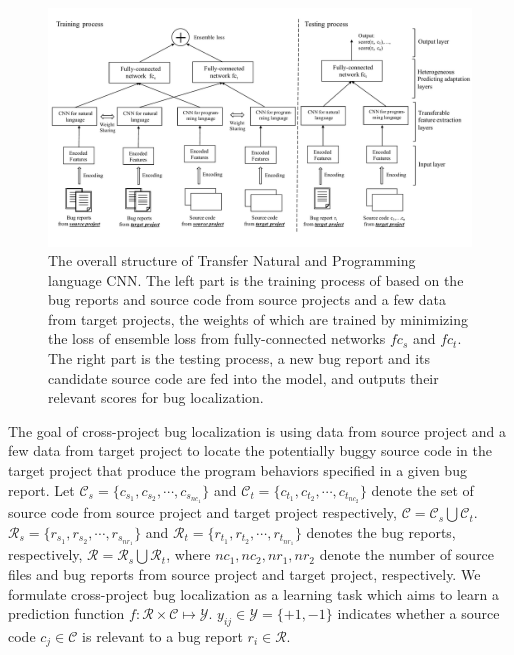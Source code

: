 \begin{figure}[hbt]
\centering
\includegraphics[width = 2\columnwidth]{pic/structure.pdf}
\caption{The overall structure of Transfer Natural and Programming language CNN.  The left part is the training process of \TRANPCNN based on the bug reports and source code from source projects and a few data from target projects, the weights of which are trained by minimizing the loss of ensemble loss from fully-connected networks $fc_s$ and $fc_t$. The right part is the testing process, a new bug report and its candidate source code are fed into the model, and \TRANPCNN outputs their relevant scores for bug localization.}
\label{fig:structure}
\end{figure}

The goal of cross-project bug localization is using data from source project and a few data from target project to locate the potentially buggy source code in the target project that produce the program behaviors specified in a
given bug report. Let $\mathcal{C}_s =\{ c_{s_1}, c_{s_2}, \cdots, c_{s_{nc_1}}\}$ and $\mathcal{C}_t =\{ c_{t_1}, c_{t_2}, \cdots, c_{t_{nc_2}}\}$ denote the set of source code from source project and target project respectively, $\mathcal{C}=\mathcal{C}_s \bigcup \mathcal{C}_t $. $\mathcal{R}_s =\{ r_{s_1}, r_{s_2}, \cdots, r_{s_{nr_1}}\}$ and $\mathcal{R}_t =\{ r_{t_1}, r_{t_2}, \cdots, r_{t_{nr_1}}\}$ denotes the bug reports, respectively, $\mathcal{R}=\mathcal{R}_s \bigcup \mathcal{R}_t $, where $nc_1, nc_2, nr_1, nr_2$ denote the number of source files and bug reports from source project and target project, respectively. We formulate cross-project bug localization as a learning task which aims to learn a prediction function $f: \mathcal{R} \times \mathcal{C} \mapsto \mathcal{Y}$. $y_{ij} \in \mathcal{Y} = \{+1, -1 \}$ indicates whether a source code $c_j \in \mathcal{C} $ is relevant to a bug report $r_i \in \mathcal{R}$.

